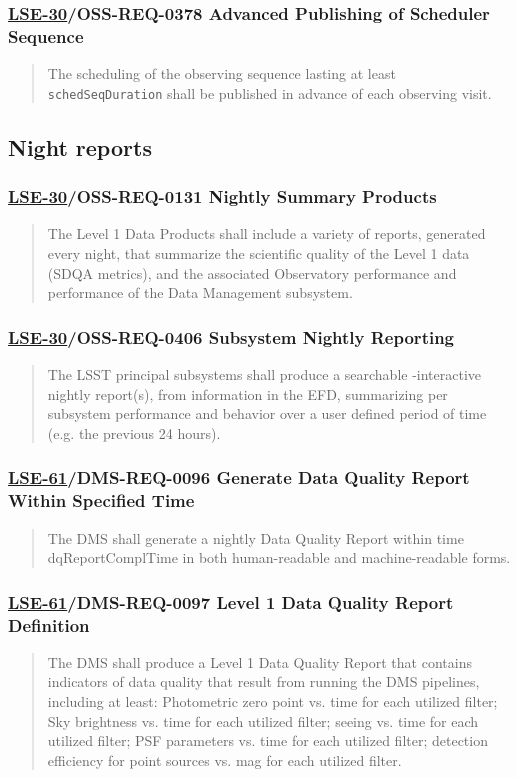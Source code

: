 \subsubsection{\href{https://ls.st/lse-30}{LSE-30}/OSS-REQ-0378 Advanced Publishing of Scheduler Sequence}
\label{sec:orgdf79be4}
\begin{quote}
The scheduling of the observing sequence lasting at least \texttt{schedSeqDuration} shall be published in advance of each observing visit.
\end{quote}
\subsection{Night reports}
\label{sec:orgf08954a}
\subsubsection{\href{https://ls.st/lse-30}{LSE-30}/OSS-REQ-0131 Nightly Summary Products}
\label{sec:orgf5a7795}
\begin{quote}
The Level 1 Data Products shall include a variety of reports, generated every night, that summarize the scientific quality of the Level 1 data (SDQA metrics), and the associated Observatory performance and performance of the Data Management subsystem.
\end{quote}
\subsubsection{\href{https://ls.st/lse-30}{LSE-30}/OSS-REQ-0406 Subsystem Nightly Reporting}
\label{sec:org9f211ee}
\begin{quote}
The LSST principal subsystems shall produce a searchable -interactive nightly report(s), from information in the EFD, summarizing per subsystem performance and behavior over a user defined period of time (e.g. the previous 24 hours).
\end{quote}
\subsubsection{\href{https://ls.st/lse-61}{LSE-61}/DMS-REQ-0096 Generate Data Quality Report Within Specified Time}
\label{sec:org7252852}
\begin{quote}
The DMS shall generate a nightly Data Quality Report within time dqReportComplTime in both human-readable and machine-readable forms.
\end{quote}
\subsubsection{\href{https://ls.st/lse-61}{LSE-61}/DMS-REQ-0097 Level 1 Data Quality Report Definition}
\label{sec:orgf49cfc4}
\begin{quote}
The DMS shall produce a Level 1 Data Quality Report that contains indicators of data quality that result from running the DMS pipelines, including at least: Photometric zero point vs. time for each utilized filter; Sky brightness vs. time for each utilized filter; seeing vs. time for each utilized filter; PSF parameters vs. time for each utilized filter; detection efficiency for point sources vs. mag for each utilized filter.
\end{quote}
